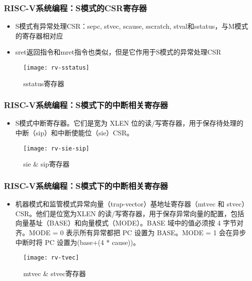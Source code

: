 \begin{frame}
    \frametitle{RISC-V系统编程：S模式的CSR寄存器}

    \begin{itemize}
        \item S模式有异常处理CSR：sepc, stvec, scause, sscratch, stval和sstatus，与M模式的寄存器相对应
        \item sret返回指令和mret指令也类似，但是它作用于S模式的异常处理CSR
        
    \end{itemize}
    
        \begin{figure}
    \centering
    \texttt{[image: rv-sstatus]}
            \caption{sstatus寄存器}
        \end{figure}
    
\end{frame}


\begin{frame}
    \frametitle{RISC-V系统编程：S模式下的中断相关寄存器}
    \begin{itemize}
        \item S模式中断寄存器。它们是宽为 XLEN 位的读/写寄存器，用于保存待处理的中断（sip）和中断使能位（sie）CSR。
    \end{itemize}   
    \begin{figure}
        \centering
        \texttt{[image: rv-sie-sip]}
        \caption{sie  \& sip寄存器}
    \end{figure}
\end{frame}


\begin{frame}
    \frametitle{RISC-V系统编程：S模式下的中断相关寄存器}
    \begin{itemize}
        \item 机器模式和监管模式异常向量（trap-vector）基地址寄存器（mtvec 和 stvec）CSR。他们是位宽为XLEN 的读/写寄存器，用于保存异常向量的配置，包括向量基址（BASE）和向量模式（MODE）。BASE 域中的值必须按 4 字节对齐。MODE = 0 表示所有异常都把 PC 设置为 BASE。MODE = 1 会在异步中断时将 PC 设置为(base+(4 * cause))。
    \end{itemize}   
    \begin{figure}
        \centering
        \texttt{[image: rv-tvec]}
        \caption{mtvec  \& stvec寄存器}
    \end{figure}
\end{frame}

